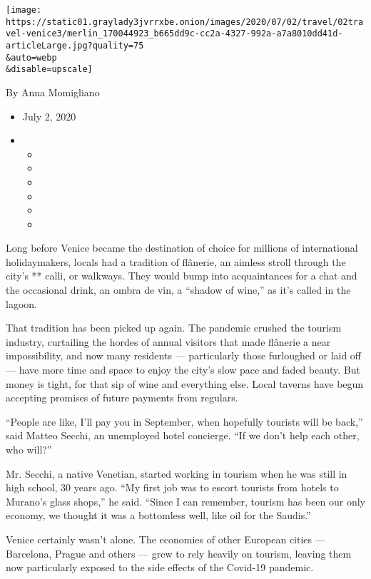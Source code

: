 \texttt{[image: https://static01.graylady3jvrrxbe.onion/images/2020/07/02/travel/02travel-venice3/merlin\_170044923\_b665dd9c-cc2a-4327-992a-a7a8010dd41d-articleLarge.jpg?quality=75\\\&auto=webp\\\&disable=upscale]}

By Anna Momigliano

\begin{itemize}
\item
  July 2, 2020
\item
  \begin{itemize}
  \item
  \item
  \item
  \item
  \item
  \item
  \end{itemize}
\end{itemize}

Long before Venice became the destination of choice for millions of
international holidaymakers, locals had a tradition of flânerie, an
aimless stroll through the city's ** calli, or walkways. They would bump
into acquaintances for a chat and the occasional drink, an ombra de vin,
a ``shadow of wine,'' as it's called in the lagoon.

That tradition has been picked up again. The pandemic crushed the
tourism industry, curtailing the hordes of annual visitors that made
flânerie a near impossibility, and now many residents --- particularly
those furloughed or laid off --- have more time and space to enjoy the
city's slow pace and faded beauty. But money is tight, for that sip of
wine and everything else. Local taverns have begun accepting promises of
future payments from regulars.

``People are like, I'll pay you in September, when hopefully tourists
will be back,'' said Matteo Secchi, an unemployed hotel concierge. ``If
we don't help each other, who will?''

Mr. Secchi, a native Venetian, started working in tourism when he was
still in high school, 30 years ago. ``My first job was to escort
tourists from hotels to Murano's glass shops,'' he said. ``Since I can
remember, tourism has been our only economy, we thought it was a
bottomless well, like oil for the Saudis.''

Venice certainly wasn't alone. The economies of other European cities
--- Barcelona, Prague and others --- grew to rely heavily on tourism,
leaving them now particularly exposed to the side effects of the
Covid-19 pandemic.

